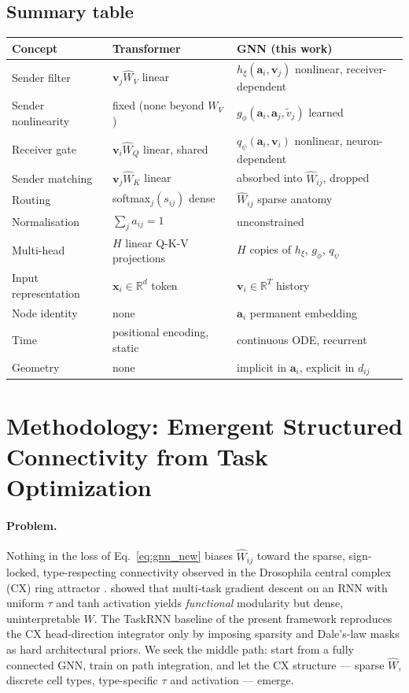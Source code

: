 \documentclass[11pt]{article}
\begin{document}
\subsection*{Summary table}

\begin{center}
\begin{tabular}{lll}
\toprule
Concept & Transformer \citep{vaswani2017} & GNN (this work) \\
\midrule
Sender filter & $\mathbf{v}_j \hat{W}_V$ linear &
  $h_\xi(\mathbf{a}_i, \mathbf{v}_j)$ nonlinear, receiver-dependent \\
Sender nonlinearity & fixed (none beyond $W_V$) &
  $g_\phi(\mathbf{a}_i, \mathbf{a}_j, \tilde{v}_j)$ learned \\
Receiver gate & $\mathbf{v}_i \hat{W}_Q$ linear, shared &
  $q_\psi(\mathbf{a}_i, \mathbf{v}_i)$ nonlinear, neuron-dependent \\
Sender matching & $\mathbf{v}_j \hat{W}_K$ linear &
  absorbed into $\hat{W}_{ij}$, dropped \\
Routing & softmax$_j(s_{ij})$ dense &
  $\hat{W}_{ij}$ sparse anatomy \\
Normalisation & $\sum_j a_{ij} = 1$ & unconstrained \\
Multi-head & $H$ linear Q-K-V projections &
  $H$ copies of $h_\xi$, $g_\phi$, $q_\psi$ \\
Input representation & $\mathbf{x}_i \in \mathbb{R}^d$ token &
  $\mathbf{v}_i \in \mathbb{R}^T$ history \\
Node identity & none & $\mathbf{a}_i$ permanent embedding \\
Time & positional encoding, static & continuous ODE, recurrent \\
Geometry & none & implicit in $\mathbf{a}_i$, explicit in $d_{ij}$ \\
\bottomrule
\end{tabular}
\end{center}

\section{Methodology: Emergent Structured Connectivity from Task Optimization}

\paragraph{Problem.} Nothing in the loss of Eq.~\ref{eq:gnn_new} biases
$\hat{W}_{ij}$ toward the sparse, sign-locked, type-respecting
connectivity observed in the Drosophila central complex (CX) ring
attractor \citep{hulse2021}. \citet{yang2019} showed that multi-task
gradient descent on an RNN with uniform $\tau$ and tanh activation
yields \emph{functional} modularity but dense, uninterpretable $W$.
The TaskRNN baseline of the present framework reproduces the CX
head-direction integrator only by imposing sparsity and Dale's-law
masks as hard architectural priors. We seek the middle path: start
from a fully connected GNN, train on path integration, and let the
CX structure --- sparse $\hat{W}$, discrete cell types, type-specific
$\tau$ and activation --- emerge.
\end{document}
